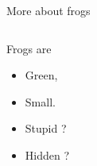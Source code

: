 \documentclass[10pt,a4paper, dvipsnames]{beamer}
\begin{document}
  \begin{frame}{More about frogs}
  \transsplitverticalout
     \begin{columns}[c]
     \begin{block}{Frogs are}
       \begin{itemize}
         \item Green,
         \item<2-3> Small.
         \item<2> Stupid ?
         \item<4> Hidden ?
       \end{itemize}
     \end{block}
     \end{columns}
\end{frame}
\end{document}
